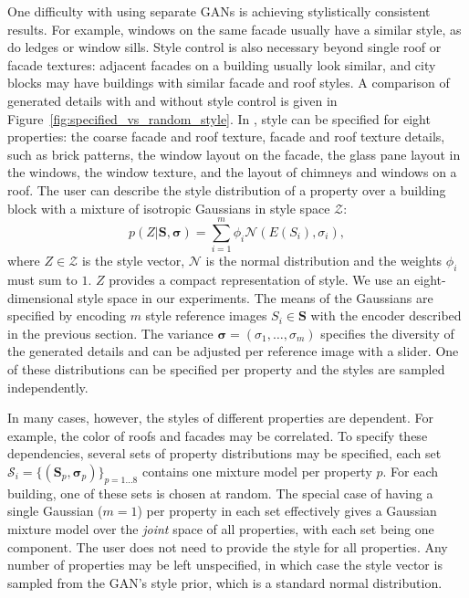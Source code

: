 One difficulty with using separate GANs is achieving stylistically consistent results. For example, windows on the same facade usually have a similar style, as do ledges or window sills. Style control is also necessary beyond single roof or facade textures: adjacent facades on a building usually look similar, and city blocks may have buildings with similar facade and roof styles. A comparison of generated details with and without style control is given in Figure~\ref{fig:specified_vs_random_style}.
%
In \systemName, style can be specified for eight properties: the coarse facade and roof texture, facade and roof texture details, such as brick patterns, the window layout on the facade, the glass pane layout in the windows, the window texture, and the layout of chimneys and windows on a roof. The user can describe the style distribution of a property over a building block with a mixture of isotropic Gaussians in style space $\mathcal{Z}$:
\begin{equation}
    p(Z|\mathbf{S}, \bm{\sigma}) = \sum _{i=1}^{m}\phi_{i}\mathcal{N}(E(S_i),\sigma_{i}),
\end{equation}
where $Z \in \mathcal{Z}$ is the style vector, $\mathcal{N}$ is the normal distribution and the weights $\phi_{i}$ must sum to $1$. $Z$ provides a compact representation of style. We use an eight-dimensional style space in our experiments. The means of the Gaussians are specified by encoding $m$ style reference images $S_i \in \mathbf{S}$ with the encoder described in the previous section. The variance $\bm{\sigma} = (\sigma_1, \dots, \sigma_m)$ specifies the diversity of the generated details and can be adjusted per reference image with a slider. One of these distributions can be specified per property and the styles are sampled independently.

In many cases, however, the styles of different properties are dependent. For example, the color of roofs and facades may be correlated. To specify these dependencies, several sets of property distributions may be specified, each set $\mathcal{S}_i = \{(\mathbf{S}_p, \bm{\sigma}_p)\}_{p=1 \dots 8}$ contains one mixture model per property $p$. For each building, one of these sets is chosen at random. The special case of having a single Gaussian ($m=1$) per property in each set effectively gives a Gaussian mixture model over the \emph{joint} space of all properties, with each set being one component. The user does not need to provide the style for all properties. Any number of properties may be left unspecified, in which case the style vector is sampled from the GAN's style prior, which is a standard normal distribution.


